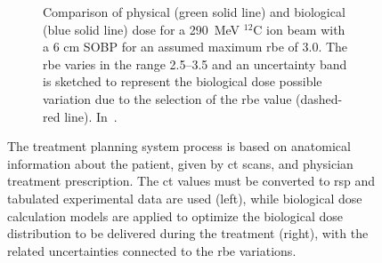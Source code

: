 \begin{figure}[!htbp]
\begin{subfigure}[t]{.49\textwidth}
\caption{Comparison of physical (green solid line) and biological (blue solid line) dose for a 290~MeV $^{12}$C ion beam with a 6 cm SOBP for an assumed maximum \gls{rbe} of 3.0. The \gls{rbe} varies in the range 2.5–3.5 and an uncertainty band is sketched to represent the biological dose possible variation due to the selection of the \gls{rbe} value (dashed-red line). In~\cite{Suit2010}.}
\label{chap1::fig::rbeDose}
\end{subfigure}
\caption{The treatment planning system process is based on anatomical information about the patient, given by \gls{ct} scans, and physician treatment prescription. The \gls{ct} values must be converted to \gls{rsp} and tabulated experimental data are used (left), while biological dose calculation models are applied to optimize the biological dose distribution to be delivered during the treatment (right), with the related uncertainties connected to the \gls{rbe} variations.}
\label{chap1::fig::TPS}
\end{figure}           

